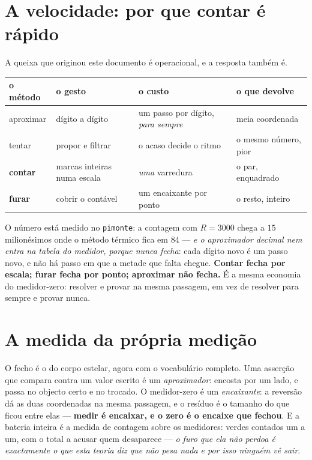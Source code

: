\documentclass[11pt,a4paper]{article}
\newcommand{\code}[1]{\texttt{\small #1}}
\begin{document}
\section{A velocidade: por que contar é rápido}

A queixa que originou este documento é operacional, e a resposta também é.

\begin{center}\small
\begin{tabular}{@{}llll@{}}
\toprule
o método & o gesto & o custo & o que devolve \\
\midrule
aproximar & dígito a dígito & um passo por dígito, \emph{para sempre} & meia coordenada \\
tentar & propor e filtrar & o acaso decide o ritmo & o mesmo número, pior \\
\textbf{contar} & marcas inteiras numa escala & \emph{uma} varredura & o par, enquadrado \\
\textbf{furar} & cobrir o contável & um encaixante por ponto & o resto, inteiro \\
\bottomrule
\end{tabular}
\end{center}

\noindent O número está medido no \code{pimonte}: a contagem com $R=3000$ chega a $15$
milionésimos onde o método térmico fica em $84$ --- \emph{e o aproximador decimal nem entra na
tabela do medidor, porque nunca fecha}: cada dígito novo é um passo novo, e não há passo em que a
metade que falta chegue. \textbf{Contar fecha por escala; furar fecha por ponto; aproximar não
fecha.} É a mesma economia do medidor-zero: resolver e provar na mesma passagem, em vez de
resolver para sempre e provar nunca.

\section{A medida da própria medição}

O fecho é o do corpo estelar, agora com o vocabulário completo. Uma asserção que compara contra um
valor escrito é um \emph{aproximador}: encosta por um lado, e passa no objecto certo e no trocado.
O medidor-zero é um \emph{encaixante}: a reversão dá as duas coordenadas na mesma passagem, e o
resíduo é o tamanho do que ficou entre elas --- \textbf{medir é encaixar, e o zero é o encaixe que
fechou}. E a bateria inteira é a medida de contagem sobre os medidores: verdes contados um a um,
com o total a acusar quem desaparece --- \emph{o furo que ela não perdoa é exactamente o que esta
teoria diz que não pesa nada e por isso ninguém vê sair}.
\end{document}
